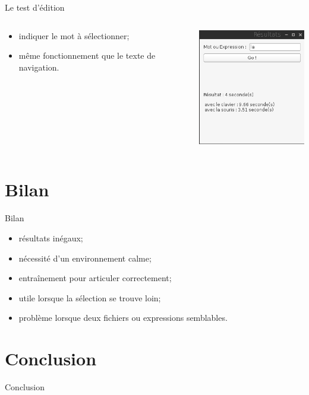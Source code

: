 \documentclass{beamer}
\begin{document}
\begin{frame}{Le test d'édition}

	\begin{columns}[c]
	
	\begin{column}{5cm}
	\begin{itemize}
		\item indiquer le mot à sélectionner;
		\item même fonctionnement que le texte de navigation.
	\end{itemize}
  	\end{column}
	\begin{column}{5cm}
		\includegraphics[width=5cm]{test_edit_finish}\\
  	\end{column}

	\end{columns}

\end{frame}

	\section{Bilan}
	
\begin{frame}{Bilan}

	\begin{itemize}
		\item résultats inégaux;
		\item nécessité d'un environnement calme;
		\item entraînement pour articuler correctement;
		\item utile lorsque la sélection se trouve loin;
		\item problème lorsque deux fichiers ou expressions semblables.
	\end{itemize}

\end{frame}

	\section{Conclusion}
	
\begin{frame}{Conclusion}



\end{frame}




	
\end{document}
